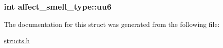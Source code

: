 \hypertarget{structaffect__smell__type_adb1543d2f301fb9532831c9325147edd}{
\subsubsection[{uu6}]{\setlength{\rightskip}{0pt plus 5cm}int affect\-\_\-smell\-\_\-type\-::uu6}}\label{structaffect__smell__type_adb1543d2f301fb9532831c9325147edd}


The documentation for this struct was generated from the following file\-:\begin{DoxyCompactItemize}
\item 
\hyperlink{structs_8h}{structs.\-h}\end{DoxyCompactItemize}
